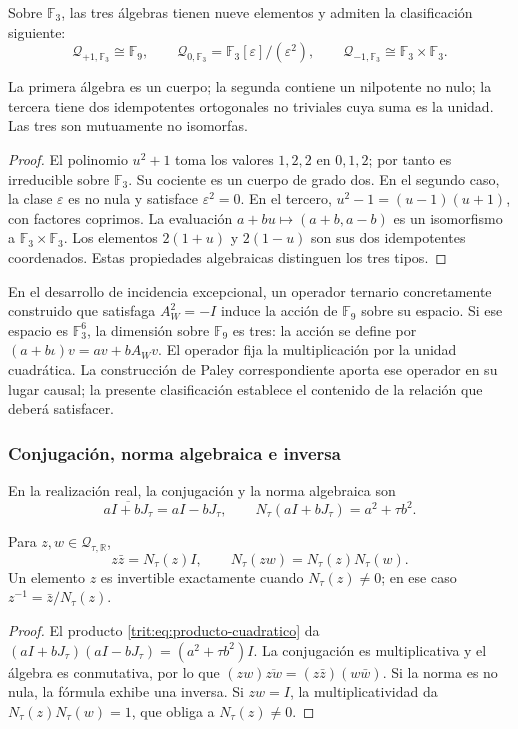 Sobre \(\mathbb F_3\), las tres álgebras tienen nueve elementos y admiten
la clasificación siguiente:
\[
 \mathcal Q_{+1,\mathbb F_3}\cong\mathbb F_9,\qquad
 \mathcal Q_{0,\mathbb F_3}=\mathbb F_3[\varepsilon]/(\varepsilon^2),
 \qquad
 \mathcal Q_{-1,\mathbb F_3}\cong\mathbb F_3\times\mathbb F_3.
\]

\begin{proposicion}
\label{trit:prop:tres-tipos}
La primera álgebra es un cuerpo; la segunda contiene un nilpotente no
nulo; la tercera tiene dos idempotentes ortogonales no triviales cuya
suma es la unidad. Las tres son mutuamente no isomorfas.
\end{proposicion}
\begin{proof}
El polinomio \(u^2+1\) toma los valores \(1,2,2\) en \(0,1,2\);
por tanto es irreducible sobre \(\mathbb F_3\). Su cociente es un
cuerpo de grado dos. En el segundo caso, la clase \(\varepsilon\) es
no nula y satisface \(\varepsilon^2=0\). En el tercero,
\(u^2-1=(u-1)(u+1)\), con factores coprimos. La evaluación
\(a+bu\mapsto(a+b,a-b)\) es un isomorfismo a
\(\mathbb F_3\times\mathbb F_3\). Los elementos
\(2(1+u)\) y \(2(1-u)\) son sus dos idempotentes coordenados.
Estas propiedades algebraicas distinguen los tres tipos.
\end{proof}

En el desarrollo de incidencia excepcional, un operador ternario
concretamente construido que satisfaga \(A_W^2=-I\) induce la acción de
\(\mathbb F_9\) sobre su espacio. Si ese espacio es \(\mathbb F_3^6\),
la dimensión sobre \(\mathbb F_9\) es tres: la acción se define por
\((a+b\iota)v=av+bA_Wv\). El operador fija la multiplicación por la
unidad cuadrática. La construcción de Paley correspondiente aporta ese
operador en su lugar causal; la presente clasificación establece el
contenido de la relación que deberá satisfacer.

\subsubsection{Conjugación, norma algebraica e inversa}

En la realización real, la conjugación y la norma algebraica son
\[
 \overline{aI+bJ_\tau}=aI-bJ_\tau,\qquad
 N_\tau(aI+bJ_\tau)=a^2+\tau b^2.
\]

\begin{proposicion}
\label{trit:prop:norma}
Para \(z,w\in\mathcal Q_{\tau,\mathbb R}\),
\[
 z\bar z=N_\tau(z)I,
 \qquad N_\tau(zw)=N_\tau(z)N_\tau(w).
\]
Un elemento \(z\) es invertible exactamente cuando \(N_\tau(z)\ne0\);
en ese caso \(z^{-1}=\bar z/N_\tau(z)\).
\end{proposicion}
\begin{proof}
El producto \eqref{trit:eq:producto-cuadratico} da
\((aI+bJ_\tau)(aI-bJ_\tau)=(a^2+\tau b^2)I\).
La conjugación es multiplicativa y el álgebra es conmutativa, por lo que
\((zw)\overline{zw}=(z\bar z)(w\bar w)\). Si la norma es no nula,
la fórmula exhibe una inversa. Si \(zw=I\), la multiplicatividad da
\(N_\tau(z)N_\tau(w)=1\), que obliga a \(N_\tau(z)\ne0\).
\end{proof}

